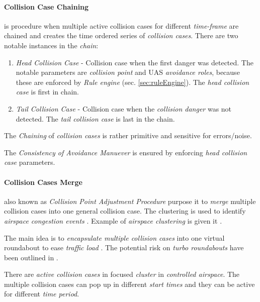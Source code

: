 \paragraph{Collision Case Chaining} is procedure when multiple active collision cases for different \emph{time-frame} are chained and creates the time ordered series of \emph{collision cases}. There are two notable instances in the \emph{chain}:
\begin{enumerate}
    \item \emph{Head Collision Case} - Collision case when the first danger was detected. The notable parameters are \emph{collision point} and UAS \emph{avoidance roles}, because these are enforced by \emph{Rule engine} (sec. \ref{sec:ruleEngine}). The \emph{head collision case} is first in chain.
    
    \item \emph{Tail Collision Case} -  Collision case when the \emph{collision danger} was not detected. The \emph{tail collision case} is last in the chain.  
\end{enumerate}

\begin{note}
    The \emph{Chaining} of \emph{collision cases} is rather primitive and sensitive for errors/noise.
    
    The \emph{Consistency of Avoidance Manuever} is ensured by enforcing \emph{head collision case} parameters. 
\end{note}

\paragraph{Collision Cases Merge} also known as \emph{Collision Point Adjustment Procedure} purpose it to \emph{merge} multiple collision cases into one general collision case. The clustering is used to identify \emph{airspace congestion events} \cite{bilimoria2005analysis}. Example of \emph{airspace clustering} is given it \cite{brinton2008airspace}.

The main idea is to \emph{encapsulate multiple collision cases} into one virtual roundabout to ease \emph{traffic load} \cite{fouladvand2004characteristics}. The potential risk on \emph{turbo roundabouts} have been outlined in \cite{mauro2010potential}.

There are \emph{active collision cases} in focused \emph{cluster} in \emph{controlled airspace}. The multiple collision cases can pop up in different \emph{start times} and they can be active for different \emph{time period}. 

